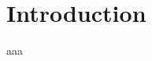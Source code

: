 \begin{hidden}
 
\end{hidden}


\begin{abstract}

\end{abstract}

\section{Introduction}

aaa

\cite{Asai2016}
